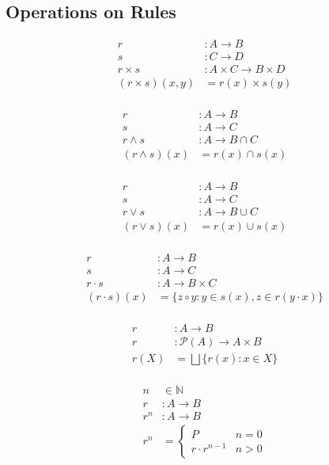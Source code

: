 \documentclass{article}
\theoremstyle{definition}
\theoremstyle{plain}
\begin{document}
\subsection{Operations on Rules} %
\begin{align*}
              r & : A \rightarrow B \\
              s & : C \rightarrow D \\
     r \times s & : A \times C \rightarrow B \times D \\
    (r \times s) (x, y) & = r (x) \times s (y) \\
\end{align*}

\begin{align*}
              r & : A \rightarrow B \\
              s & : A \rightarrow C \\
     r \wedge s & : A \rightarrow B \cap C \\
    (r \wedge s) (x) & = r (x) \cap s (x) \\ 
\end{align*}

\begin{align*}
            r & : A \rightarrow B \\
            s & : A \rightarrow C \\
     r \vee s & : A \rightarrow B \cup C \\
    (r \vee   s) (x) & = r (x) \cup s (x) \\
\end{align*}

\begin{align*}
             r & : A \rightarrow B \\
             s & : A \rightarrow C \\
     r \cdot s & : A \rightarrow B \times C \\
    (r \cdot  s) (x) & = \{ z \circ y : y \in s (x), z \in r (y \cdot x) \} \\
\end{align*}

\begin{align*}
              r  & : A \rightarrow B \\
     \widehat{r} & : \mathcal{P} (A) \rightarrow A \times B \\
     \widehat{r} (X) & = \bigsqcup \{ r (x) : x \in X \} \\
\end{align*}

\begin{align*}
              n & \in \mathbb{N} \\
              r & : A \rightarrow B \\
            r^n & : A \rightarrow B \\
                 r^n & = \begin{cases}
                           P               & n = 0  \\
                           r \cdot r^{n-1} & n > 0
                         \end{cases} \\
\end{align*}
\end{document}
